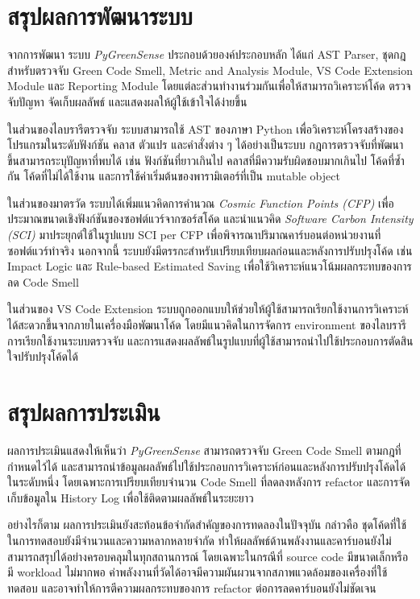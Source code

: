 
\section{สรุปผลการพัฒนาระบบ}

จากการพัฒนา ระบบ \textit{PyGreenSense} ประกอบด้วยองค์ประกอบหลัก ได้แก่ AST Parser, ชุดกฎสำหรับตรวจจับ Green Code Smell, Metric and Analysis Module, VS Code Extension Module และ Reporting Module โดยแต่ละส่วนทำงานร่วมกันเพื่อให้สามารถวิเคราะห์โค้ด ตรวจจับปัญหา จัดเก็บผลลัพธ์ และแสดงผลให้ผู้ใช้เข้าใจได้ง่ายขึ้น

ในส่วนของไลบรารีตรวจจับ ระบบสามารถใช้ AST ของภาษา Python เพื่อวิเคราะห์โครงสร้างของโปรแกรมในระดับฟังก์ชัน คลาส ตัวแปร และคำสั่งต่าง ๆ ได้อย่างเป็นระบบ กฎการตรวจจับที่พัฒนาขึ้นสามารถระบุปัญหาที่พบได้ เช่น ฟังก์ชันที่ยาวเกินไป คลาสที่มีความรับผิดชอบมากเกินไป โค้ดที่ซ้ำกัน โค้ดที่ไม่ได้ใช้งาน และการใช้ค่าเริ่มต้นของพารามิเตอร์ที่เป็น mutable object

ในส่วนของมาตรวัด ระบบได้เพิ่มแนวคิดการคำนวณ \textit{Cosmic Function Points (CFP)} เพื่อประมาณขนาดเชิงฟังก์ชันของซอฟต์แวร์จากซอร์สโค้ด และนำแนวคิด \textit{Software Carbon Intensity (SCI)} มาประยุกต์ใช้ในรูปแบบ SCI per CFP เพื่อพิจารณาปริมาณคาร์บอนต่อหน่วยงานที่ซอฟต์แวร์ทำจริง นอกจากนี้ ระบบยังมีตรรกะสำหรับเปรียบเทียบผลก่อนและหลังการปรับปรุงโค้ด เช่น Impact Logic และ Rule-based Estimated Saving เพื่อใช้วิเคราะห์แนวโน้มผลกระทบของการลด Code Smell

ในส่วนของ VS Code Extension ระบบถูกออกแบบให้ช่วยให้ผู้ใช้สามารถเรียกใช้งานการวิเคราะห์ได้สะดวกขึ้นจากภายในเครื่องมือพัฒนาโค้ด โดยมีแนวคิดในการจัดการ environment ของไลบรารี การเรียกใช้งานระบบตรวจจับ และการแสดงผลลัพธ์ในรูปแบบที่ผู้ใช้สามารถนำไปใช้ประกอบการตัดสินใจปรับปรุงโค้ดได้


\section{สรุปผลการประเมิน}

ผลการประเมินแสดงให้เห็นว่า \textit{PyGreenSense} สามารถตรวจจับ Green Code Smell ตามกฎที่กำหนดไว้ได้ และสามารถนำข้อมูลผลลัพธ์ไปใช้ประกอบการวิเคราะห์ก่อนและหลังการปรับปรุงโค้ดได้ในระดับหนึ่ง โดยเฉพาะการเปรียบเทียบจำนวน Code Smell ที่ลดลงหลังการ refactor และการจัดเก็บข้อมูลใน History Log เพื่อใช้ติดตามผลลัพธ์ในระยะยาว

อย่างไรก็ตาม ผลการประเมินยังสะท้อนข้อจำกัดสำคัญของการทดลองในปัจจุบัน กล่าวคือ ชุดโค้ดที่ใช้ในการทดสอบยังมีจำนวนและความหลากหลายจำกัด ทำให้ผลลัพธ์ด้านพลังงานและคาร์บอนยังไม่สามารถสรุปได้อย่างครอบคลุมในทุกสถานการณ์ โดยเฉพาะในกรณีที่ source code มีขนาดเล็กหรือมี workload ไม่มากพอ ค่าพลังงานที่วัดได้อาจมีความผันผวนจากสภาพแวดล้อมของเครื่องที่ใช้ทดสอบ และอาจทำให้การตีความผลกระทบของการ refactor ต่อการลดคาร์บอนยังไม่ชัดเจน

